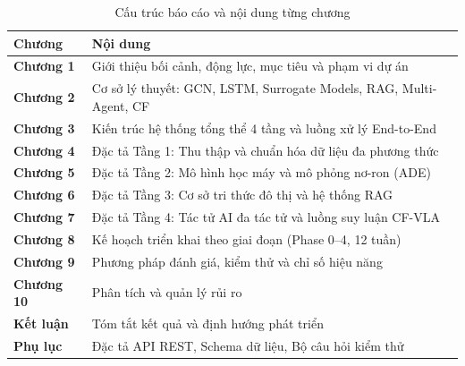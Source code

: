 \begin{table}[H]
\centering
\caption{Cấu trúc báo cáo và nội dung từng chương}
\label{tab:structure}
\renewcommand{\arraystretch}{1.4}
\begin{tabular}{>{\bfseries\centering}p{2.2cm} p{10cm}}
\toprule
\textbf{Chương} & \textbf{Nội dung} \\
\midrule
Chương 1 & Giới thiệu bối cảnh, động lực, mục tiêu và phạm vi dự án \\
\rowcolor{rowgray}
Chương 2 & Cơ sở lý thuyết: GCN, LSTM, Surrogate Models, RAG, Multi-Agent, CF \\
Chương 3 & Kiến trúc hệ thống tổng thể 4 tầng và luồng xử lý End-to-End \\
\rowcolor{rowgray}
Chương 4 & Đặc tả Tầng 1: Thu thập và chuẩn hóa dữ liệu đa phương thức \\
Chương 5 & Đặc tả Tầng 2: Mô hình học máy và mô phỏng nơ-ron (ADE) \\
\rowcolor{rowgray}
Chương 6 & Đặc tả Tầng 3: Cơ sở tri thức đô thị và hệ thống RAG \\
Chương 7 & Đặc tả Tầng 4: Tác tử AI đa tác tử và luồng suy luận CF-VLA \\
\rowcolor{rowgray}
Chương 8 & Kế hoạch triển khai theo giai đoạn (Phase 0--4, 12 tuần) \\
Chương 9 & Phương pháp đánh giá, kiểm thử và chỉ số hiệu năng \\
\rowcolor{rowgray}
Chương 10 & Phân tích và quản lý rủi ro \\
Kết luận & Tóm tắt kết quả và định hướng phát triển \\
\rowcolor{rowgray}
Phụ lục & Đặc tả API REST, Schema dữ liệu, Bộ câu hỏi kiểm thử \\
\bottomrule
\end{tabular}
\end{table}

